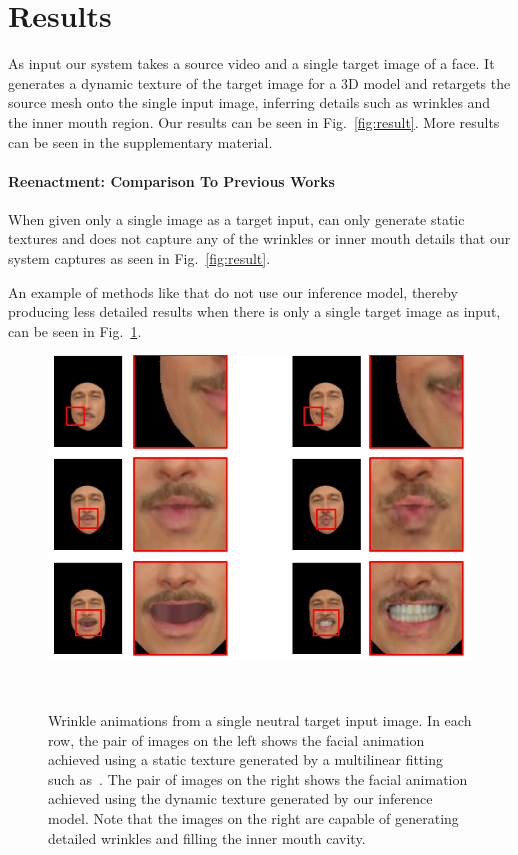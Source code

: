 \section{Results}

As input our system takes a source video and a single target image of a face. It generates a dynamic texture of the target image for a 3D model and retargets the source mesh onto the single input image, inferring details such as wrinkles and the inner mouth region.  Our results can be seen in Fig.~\ref{fig:result}. More results can be seen in the supplementary material.


\paragraph{Reenactment: Comparison To Previous Works}

When given only a single image as a target input, \cite{f2f} can only generate static textures and does not capture any of the wrinkles or inner mouth details that our system captures as seen in Fig.~\ref{fig:result}. 

An example of methods like \cite{f2f} that do not use our inference model, thereby producing less detailed results when there is only a single target image as input, can be seen in Fig.~\ref{fig:wrinkles}.


\begin{figure}[th]
	\centering
	\includegraphics[width=1.0\linewidth]{figures/wrinkles/example_crop.png}
	\caption{Wrinkle animations from a single neutral target input image. In each row, the pair of images on the left shows the facial animation achieved using a static texture generated by a multilinear fitting such as~\cite{f2f}. The pair of images on the right shows the facial animation achieved using the dynamic texture generated by our inference model. Note that the images on the right are capable of generating detailed wrinkles and filling the inner mouth cavity.}~\label{fig:wrinkles}
	\vspace{-0.2in}
\end{figure}

